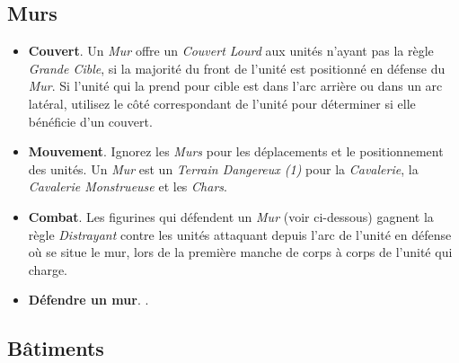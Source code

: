 \subsection{Murs}

\begin{itemize}[label={-}]
\item \textbf{Couvert}. Un \emph{Mur} offre un \emph{Couvert Lourd} aux unités n'ayant pas la règle \emph{Grande Cible}, si la majorité du front de l'unité est positionné en défense du \emph{Mur}. Si l'unité qui la prend pour cible est dans l'arc arrière ou dans un arc latéral, utilisez le côté correspondant de l'unité pour déterminer si elle bénéficie d'un couvert.
\item \textbf{Mouvement}. Ignorez les \emph{Murs} pour les déplacements et le positionnement des unités. Un \emph{Mur} est un \emph{Terrain Dangereux (1)} pour la \emph{Cavalerie}, la \emph{Cavalerie Monstrueuse} et les \emph{Chars}.
\item \textbf{Combat}. Les figurines qui défendent un \emph{Mur} (voir ci-dessous) gagnent la règle \emph{Distrayant} contre les unités attaquant depuis l'arc de l'unité en défense où se situe le mur, lors de la première manche de corps à corps de l'unité qui charge.
\item \textbf{Défendre un mur}. .
\end{itemize}

\subsection{Bâtiments}

